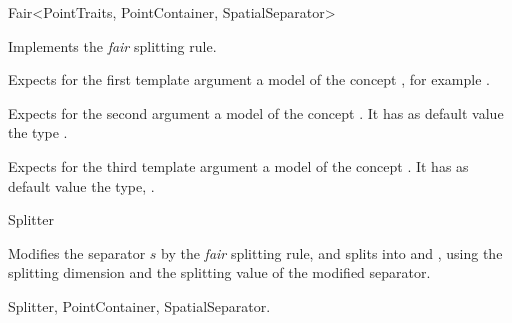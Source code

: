 

\begin{ccRefFunctionObjectClass}{Fair<PointTraits, PointContainer, SpatialSeparator>}  %


\ccDefinition
Implements the {\em fair} splitting rule.  

\ccParameters

Expects for the first template argument a model of
the concept , 
for example . 

Expects for the second argument a model of the concept . 
It has as default value the type .

Expects for the third template argument a model of the concept . 
It has as default value the type, .


\ccInheritsFrom {}

\ccIsModel

Splitter

\ccTypes




\ccOperations

{Modifies the separator $s$ by the {\em fair} splitting rule, 
and splits  into  and ,
using the splitting dimension and the splitting value of the modified separator.}

\ccSeeAlso

Splitter, PointContainer, SpatialSeparator.

\end{ccRefFunctionObjectClass}


